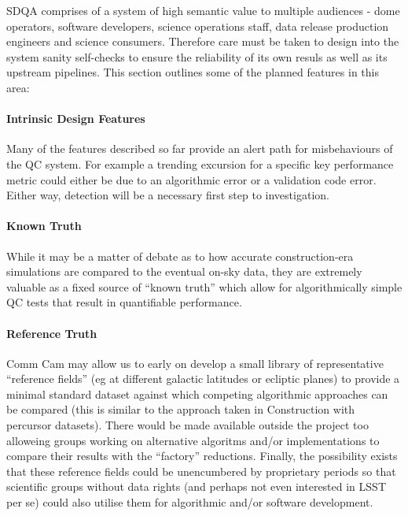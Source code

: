 SDQA comprises of a system of high semantic value to multiple
audiences - dome operators, software developers, science operations
staff, data release production engineers and science
consumers. Therefore care must be taken to design into the system
sanity self-checks to ensure the reliability of its own resuls as well
as its upstream pipelines. This section outlines some of the planned
features in this area:

\paragraph{Intrinsic Design Features}

Many of the features described so far provide an alert path for misbehaviours of the QC system. For example a trending excursion for a specific key performance metric could either be due to an algorithmic error or a validation code error. Either way, detection will be a necessary first step to investigation.

\paragraph{Known Truth}

While it may be a matter of debate as to how accurate construction-era simulations are compared to the eventual on-sky data, they are extremely valuable as a fixed source of ``known truth'' which allow for algorithmically simple QC tests that result in quantifiable performance.

\paragraph{Reference Truth}

Comm Cam may allow us to early on develop a small library of representative ``reference fields'' (eg at different galactic latitudes or ecliptic planes) to provide a minimal standard dataset against which competing algorithmic approaches can be compared (this is similar to the approach taken in Construction with percursor datasets). There would be made available outside the project too alloweing groups working on alternative algoritms and/or implementations to compare their results with the ``factory'' reductions. Finally, the possibility exists that these reference fields could be unencumbered by proprietary periods so that scientific groups without data rights (and perhaps not even interested in LSST per se) could also utilise them for algorithmic and/or software development.


